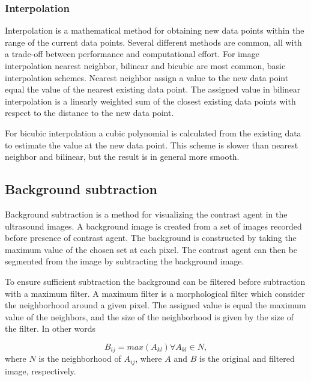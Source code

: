 \subsubsection{Interpolation}
Interpolation is a mathematical method for obtaining new data points within the range of the current data points. Several different methods are common, all with a trade-off between performance and computational effort. For image interpolation nearest neighbor, bilinear and bicubic are most common, basic interpolation schemes. Nearest neighbor assign a value to the new data point equal the value of the nearest existing data point. The assigned value in bilinear interpolation is a linearly weighted sum of the closest existing data points with respect to the distance to the new data point. 

For bicubic interpolation a cubic polynomial is calculated from the existing data to estimate the value at the new data point. This scheme is slower than nearest neighbor and bilinear, but the result is in general more smooth. 

\subsection{Background subtraction}
Background subtraction is a method for visualizing the contrast agent in the ultrasound images. A background image is created from a set of images recorded before presence of contrast agent. The background is constructed by taking the maximum value of the chosen set at each pixel. The contrast agent can then be segmented from the image by subtracting the background image. 

To ensure sufficient subtraction the background can be filtered before subtraction with a maximum filter. A maximum filter is a morphological filter which consider the neighborhood around a given pixel. The assigned value is equal the maximum value of the neighbors, and the size of the neighborhood is given by the size of the filter. In other words

\begin{equation}
B_{ij} = max(A_{kl}) \forall A_{kl} \in N,
\end{equation}
where $N$ is the neighborhood of $A_{ij}$, where $A$ and $B$ is the original and filtered image, respectively. 
%
%
%
%










